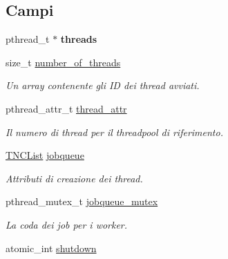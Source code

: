 \subsection*{Campi}
\begin{DoxyCompactItemize}
\item 
\hypertarget{struct__TNCFixedThreadPool_a2d9371d560acbf39c37842defa817178}{}pthread\+\_\+t $\ast$ {\bfseries threads}\label{struct__TNCFixedThreadPool_a2d9371d560acbf39c37842defa817178}

\item 
size\+\_\+t \hyperlink{struct__TNCFixedThreadPool_a228f1fcdc9d0d0fa0f8f895857fe18f2}{number\+\_\+of\+\_\+threads}
\begin{DoxyCompactList}\small\item\em Un array contenente gli I\+D dei thread avviati. \end{DoxyCompactList}\item 
pthread\+\_\+attr\+\_\+t \hyperlink{struct__TNCFixedThreadPool_afa711fbf4bf7739ba09bada86c75df88}{thread\+\_\+attr}
\begin{DoxyCompactList}\small\item\em Il numero di thread per il threadpool di riferimento. \end{DoxyCompactList}\item 
\hypertarget{struct__TNCFixedThreadPool_a658ed0040a2eadcd9166a363258850b0}{}\hyperlink{list_8h_a6234acd44af21902b91273ccdd278bf6}{T\+N\+C\+List} \hyperlink{struct__TNCFixedThreadPool_a658ed0040a2eadcd9166a363258850b0}{jobqueue}\label{struct__TNCFixedThreadPool_a658ed0040a2eadcd9166a363258850b0}

\begin{DoxyCompactList}\small\item\em Attributi di creazione dei thread. \end{DoxyCompactList}\item 
pthread\+\_\+mutex\+\_\+t \hyperlink{struct__TNCFixedThreadPool_a7b2f13485101e6bdacc4894adcce9c33}{jobqueue\+\_\+mutex}
\begin{DoxyCompactList}\small\item\em La coda dei job per i worker. \end{DoxyCompactList}\item 
\hypertarget{struct__TNCFixedThreadPool_a1a6a5d19c4d70a10c89928b46451b772}{}atomic\+\_\+int \hyperlink{struct__TNCFixedThreadPool_a1a6a5d19c4d70a10c89928b46451b772}{shutdown}\label{struct__TNCFixedThreadPool_a1a6a5d19c4d70a10c89928b46451b772}


\end{DoxyCompactItemize}
